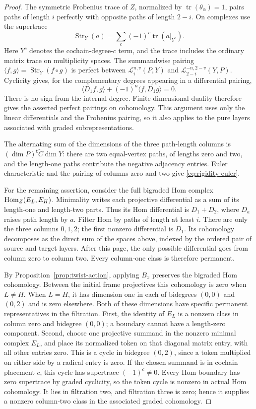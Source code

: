 \begin{proof}
The symmetric Frobenius trace of $Z$, normalized by
$\operatorname{tr}(\theta_\alpha)=1$, pairs paths of length $i$ perfectly
with opposite paths of length $2-i$.  On complexes use the supertrace
\[
 \operatorname{Str}_Y(a)
   =\sum_c(-1)^c\operatorname{tr}(a|_{Y^c}).
\]
Here $Y^c$ denotes the cochain-degree-$c$ term, and the trace includes
the ordinary matrix trace on multiplicity spaces.  The
summandwise pairing
$\langle f,g\rangle=\operatorname{Str}_Y(f\circ g)$ is perfect between
$\mathcal L_i^{n,v}(P,Y)$ and
$\mathcal L_{2-i}^{-n,2-v}(Y,P)$.  Cyclicity gives, for the complementary
degrees appearing in a differential pairing,
\[
 \langle D_1f,g\rangle+(-1)^n\langle f,D_1g\rangle=0.
\]
There is no sign from the internal degree.  Finite-dimensional duality
therefore gives the asserted perfect pairings on cohomology.  This
argument uses only the linear differentials and the Frobenius pairing,
so it also applies to the pure layers associated with graded
subrepresentations.

The alternating sum of the dimensions of the three path-length columns
is $(\dim P)^{\mathsf t}\widetilde C\dim Y$: there are two equal-vertex
paths, of lengths zero and two, and the length-one paths contribute the
negative adjacency entries.  Euler characteristic and the pairing of
columns zero and two give \eqref{eq:rigidity-euler}.

For the remaining assertion, consider the full bigraded Hom complex
$\operatorname{Hom}_Z(E_L,E_H)$.  Minimality writes each projective differential as a
sum of its length-one and length-two parts.  Thus its Hom differential is
$D_1+D_2$, where $D_a$ raises path length by $a$.  Filter Hom by paths of
length at least $i$.  There are only the three columns $0,1,2$; the first
nonzero differential is $D_1$.  Its cohomology decomposes as the direct
sum of the spaces above, indexed by the ordered pair of source and target
layers.  After this page, the only possible differential goes from column
zero to column two.  Every column-one class is therefore permanent.

By Proposition~\ref{prop:twist-action}, applying $B_x$ preserves the
bigraded Hom cohomology.  Between the initial frame projectives this
cohomology is zero when $L\ne H$.  When $L=H$, it has dimension one in each
of bidegrees $(0,0)$ and $(0,2)$ and is zero elsewhere.  Both of these
dimensions have specific permanent representatives in the filtration.
First, the identity of $E_L$ is a nonzero class in column zero and bidegree
$(0,0)$; a boundary cannot have a length-zero component.  Second, choose
one projective summand in the nonzero minimal complex $E_L$, and place its
normalized token on that diagonal matrix entry, with all other entries
zero.  This is a cycle in bidegree $(0,2)$, since a token multiplied on
either side by a radical entry is zero.  If the chosen summand is in
cochain placement $c$, this cycle has supertrace $(-1)^c\ne0$.
Every Hom boundary has zero supertrace by graded cyclicity, so the token
cycle is nonzero in actual Hom cohomology.  It lies in filtration two,
and filtration three is zero; hence it supplies a nonzero column-two
class in the associated graded cohomology.


\end{proof}
